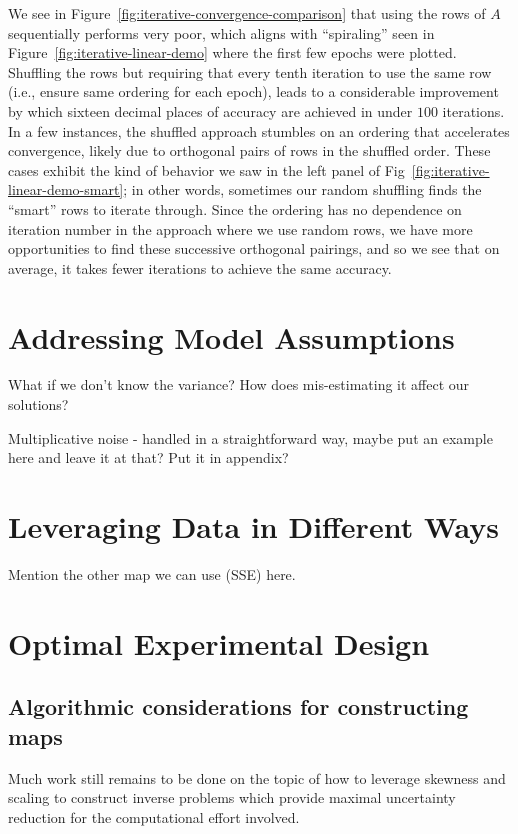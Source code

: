 We see in Figure~\ref{fig:iterative-convergence-comparison} that using the rows of $A$ sequentially performs very poor, which aligns with ``spiraling'' seen in Figure~\ref{fig:iterative-linear-demo} where the first few epochs were plotted.
Shuffling the rows but requiring that every tenth iteration to use the same row (i.e., ensure same ordering for each epoch), leads to a considerable improvement by which sixteen decimal places of accuracy are achieved in under $100$ iterations.
In a few instances, the shuffled approach stumbles on an ordering that accelerates convergence, likely due to orthogonal pairs of rows in the shuffled order.
These cases exhibit the kind of behavior we saw in the left panel of Fig~\ref{fig:iterative-linear-demo-smart}; in other words, sometimes our random shuffling finds the ``smart'' rows to iterate through.
Since the ordering has no dependence on iteration number in the approach where we use random rows, we have more opportunities to find these successive orthogonal pairings, and so we see that on average, it takes fewer iterations to achieve the same accuracy.



\section{Addressing Model Assumptions}\label{sec:ch05-variance}

What if we don't know the variance? How does mis-estimating it affect our solutions?

Multiplicative noise - handled in a straightforward way, maybe put an example here and leave it at that? Put it in appendix?


\section{Leveraging Data in Different Ways}\label{sec:ch05-data}

Mention the other map we can use (SSE) here.


\section{Optimal Experimental Design}\label{sec:ch05-oed}


\subsection{Algorithmic considerations for constructing maps}
Much work still remains to be done on the topic of how to leverage skewness and scaling to construct inverse problems which provide maximal uncertainty reduction for the computational effort involved.


